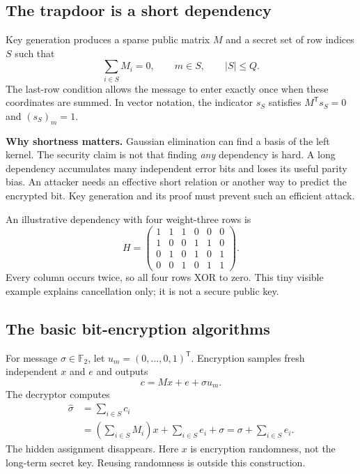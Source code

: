 \documentclass[11pt,a4paper]{article}
\newcommand{\F}{\mathbb F}
\begin{document}
\subsection{The trapdoor is a short dependency}
Key generation produces a sparse public matrix $M$ and a secret set of row indices $S$ such that
\begin{equation}
 \sum_{i\in S}M_i=0,\qquad m\in S,\qquad |S|\leq Q.
\end{equation}
The last-row condition allows the message to enter exactly once when these coordinates are summed. In vector notation, the indicator $s_S$ satisfies $M^\mathsf T s_S=0$ and $(s_S)_m=1$.

\textbf{Why shortness matters.} Gaussian elimination can find a basis of the left kernel. The security claim is not that finding \emph{any} dependency is hard. A long dependency accumulates many independent error bits and loses its useful parity bias. An attacker needs an effective short relation or another way to predict the encrypted bit. Key generation and its proof must prevent such an efficient attack.

An illustrative dependency with four weight-three rows is
\[
 H=\begin{pmatrix}
 1&1&1&0&0&0\\1&0&0&1&1&0\\0&1&0&1&0&1\\0&0&1&0&1&1
 \end{pmatrix}.
\]
Every column occurs twice, so all four rows XOR to zero. This tiny visible example explains cancellation only; it is not a secure public key.

\subsection{The basic bit-encryption algorithms}
For message $\sigma\in\F_2$, let $u_m=(0,\ldots,0,1)^\mathsf T$. Encryption samples fresh independent $x$ and $e$ and outputs
\begin{equation}\boxed{c=Mx+e+\sigma u_m.}\label{eq:enc}\end{equation}
The decryptor computes
\begin{align}
 \widehat\sigma&=\sum_{i\in S}c_i\\
 &=\left(\sum_{i\in S}M_i\right)x+\sum_{i\in S}e_i+\sigma
 =\sigma+\sum_{i\in S}e_i.\label{eq:dec}
\end{align}
The hidden assignment disappears. Here $x$ is encryption randomness, not the long-term secret key. Reusing randomness is outside this construction.
\end{document}
